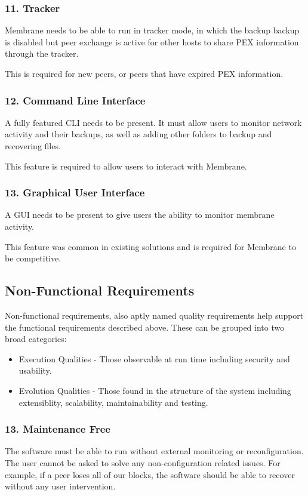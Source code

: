 \documentclass[11pt, a4paper, twocolumn, twoside]{report}
\begin{document}
\subsubsection{11. Tracker}

Membrane needs to be able to run in tracker mode, in which the backup backup is disabled but peer exchange is active for other hosts to share PEX information through the tracker.

This is required for new peers, or peers that have expired PEX information.

\subsubsection{12. Command Line Interface}

A fully featured CLI needs to be present. It must allow users to monitor network activity and their backups, as well as adding other folders to backup and recovering files.

This feature is required to allow users to interact with Membrane.

\subsubsection{13. Graphical User Interface}

A GUI needs to be present to give users the ability to monitor membrane activity.

This feature was common in existing solutions and is required for Membrane to be competitive.

\subsection{Non-Functional Requirements}

Non-functional requirements, also aptly named quality requirements help support the functional requirements described above. These can be grouped into two broad categories:
\begin{itemize}
 \item Execution Qualities - Those observable at run time including security and usability.
 \item Evolution Qualities - Those found in the structure of the system including extensiblity, scalability, maintainability and testing.
\end{itemize}

\subsubsection{13. Maintenance Free}
The software must be able to run without external monitoring or reconfiguration. The user cannot be asked to solve any non-configuration related issues. For example, if a peer loses all of our blocks, the software should be able to recover without any user intervention.
\end{document}
